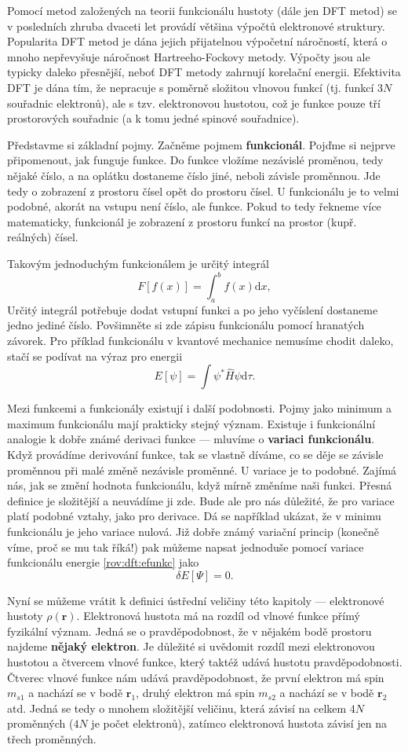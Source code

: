 Pomocí metod založených na teorii funkcionálu hustoty (dále jen DFT metod) se v posledních zhruba dvaceti let provádí většina výpočtů elektronové struktury. Popularita DFT metod je dána jejich přijatelnou výpočetní náročností, která o mnoho nepřevyšuje náročnost Hartreeho-Fockovy 
metody. Výpočty jsou ale typicky daleko přesnější, neboť DFT metody zahrnují korelační energii. Efektivita DFT je dána tím, že nepracuje s poměrně složitou vlnovou funkcí (tj. funkcí 3$N$ souřadnic elektronů), ale s tzv. elektronovou hustotou, což je funkce pouze tří prostorových souřadnic (a k tomu jedné spinové souřadnice). 

Představme si základní pojmy. Začněme pojmem \textbf{funkcionál}. Pojďme si nejprve připomenout, jak funguje funkce. Do funkce vložíme nezávislé proměnou, tedy nějaké číslo, a na oplátku dostaneme číslo jiné, neboli závisle proměnnou. Jde tedy o zobrazení z prostoru čísel opět do prostoru čísel. U funkcionálu je to velmi podobné, akorát na vstupu není číslo, ale funkce. Pokud to tedy řekneme více matematicky, funkcionál je zobrazení z prostoru funkcí na prostor (kupř. reálných) čísel.

Takovým jednoduchým funkcionálem je určitý integrál
$$
F[f(x)] = \int_a^b f(x) \mathrm{d}x, 
$$
Určitý integrál potřebuje dodat vstupní funkci a po jeho vyčíslení dostaneme jedno jediné číslo. Povšimněte si zde zápisu funkcionálu pomocí hranatých závorek.  
Pro příklad funkcionálu v kvantové mechanice nemusíme chodit daleko, stačí se podívat na výraz pro energii
$$
E[\psi] = \int \psi^*\hat{H}\psi \mathrm{d}\tau .
\label{rov:dft:efunkc}
$$


Mezi funkcemi a funkcionály existují i další podobnosti. Pojmy jako minimum a maximum funkcionálu mají prakticky stejný význam. Existuje i funkcionální analogie k dobře známé derivaci funkce --- mluvíme o \textbf{variaci funkcionálu}.
Když provádíme derivování funkce, tak se vlastně díváme, co se děje se závisle proměnnou při malé změně nezávisle proměnné.
U variace je to podobné. Zajímá nás, jak se změní hodnota funkcionálu, když mírně změníme naši funkci. Přesná definice je složitější a neuvádíme ji zde. Bude ale pro nás důležité, že pro variace platí podobné vztahy, jako pro derivace. Dá se například ukázat, že v minimu funkcionálu je jeho variace nulová. Již dobře známý variační princip (konečně víme, proč se mu tak říká!) pak můžeme napsat jednoduše pomocí variace funkcionálu energie \eqref{rov:dft:efunkc} jako
$$
\delta E[\Psi] = 0 .
$$

Nyní se můžeme vrátit k definici ústřední veličiny této kapitoly --- elektronové hustoty $\rho(\mathbf{r})$.
Elektronová hustota má na rozdíl od vlnové funkce přímý fyzikální význam. Jedná se o pravděpodobnost, že v nějakém bodě prostoru najdeme \textbf{nějaký elektron}. Je důležité si uvědomit rozdíl mezi elektronovou hustotou a čtvercem vlnové funkce, který taktéž udává hustotu pravděpodobnosti. Čtverec vlnové funkce nám udává pravděpodobnost, že první elektron má spin $m_{s1}$ a nachází se v bodě $\mathbf{r}_1$, druhý elektron má spin $m_{s2}$ a nachází se v bodě $\mathbf{r}_2$ atd. Jedná se tedy o mnohem složitější veličinu, která závisí na celkem $4N$ proměnných ($4N$ je počet elektronů), zatímco elektronová hustota závisí jen na třech proměnných.

